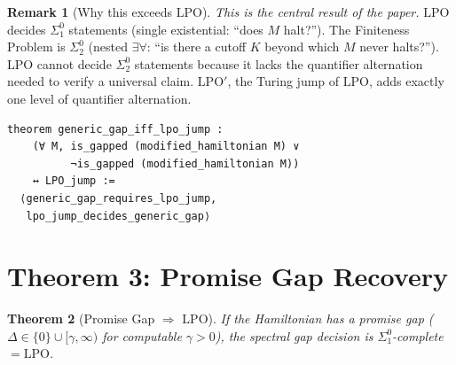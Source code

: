 \documentclass[11pt,a4paper]{article}
\theoremstyle{plain}
\newtheorem{theorem}{Theorem}[section]
\theoremstyle{definition}
\newtheorem{remark}[theorem]{Remark}
\newcommand{\LPO}{\ensuremath{\mathrm{LPO}}}
\newcommand{\LPOj}{\ensuremath{\mathrm{LPO'}}}
\begin{document}
\begin{remark}[Why this exceeds $\LPO$]\label{rem:exceed}
\emph{This is the central result of the paper.}
$\LPO$ decides $\Sigma_1^0$ statements (single existential:
``does $M$ halt?'').
The Finiteness Problem is $\Sigma_2^0$ (nested $\exists\forall$:
``is there a cutoff $K$ beyond which $M$ never halts?'').
$\LPO$ cannot decide $\Sigma_2^0$ statements because it lacks the
quantifier alternation needed to verify a universal claim.
$\LPOj$, the Turing jump of $\LPO$, adds exactly one
level of quantifier alternation.
\end{remark}

\begin{lstlisting}[caption={Generic gap $\leftrightarrow$ $\LPOj$: \texttt{GenericGapSigma2.lean}}]
theorem generic_gap_iff_lpo_jump :
    (∀ M, is_gapped (modified_hamiltonian M) ∨
          ¬is_gapped (modified_hamiltonian M))
    ↔ LPO_jump :=
  ⟨generic_gap_requires_lpo_jump,
   lpo_jump_decides_generic_gap⟩
\end{lstlisting}

\section{Theorem 3: Promise Gap Recovery}\label{sec:promise}

\begin{theorem}[Promise Gap $\Rightarrow$ $\LPO$]\label{thm:promise}
If the Hamiltonian has a promise gap
($\Delta \in \{0\} \cup [\gamma, \infty)$ for computable $\gamma > 0$),
the spectral gap decision is $\Sigma_1^0$-complete $= \LPO$.
\end{theorem}
\end{document}
